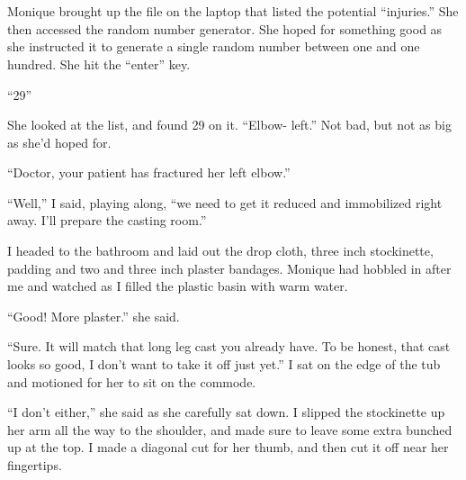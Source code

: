 \chapter{~}
\begin{thought}
Monique brought up the file on the laptop that listed the potential ``injuries.'' She then
accessed the random number generator. She hoped for something good as she instructed it to
generate a single random number between one and one hundred. She hit the ``enter'' key.
\end{thought}

``29''

\begin{thought}
She looked at the list, and found 29 on it. ``Elbow- left.'' Not bad, but not as big as she'd
hoped for.
\end{thought}

``Doctor, your patient has fractured her left elbow.''

``Well,'' I said, playing along, ``we need to get it reduced and immobilized right away. I'll
prepare the casting room.''

I headed to the bathroom and laid out the drop cloth, three inch stockinette, padding and
two and three inch plaster bandages. Monique had hobbled in after me and watched as I filled the
plastic basin with warm water.

``Good! More plaster.'' she said.

``Sure. It will match that long leg cast you already have. To be honest, that cast looks so
good, I don't want to take it off just yet.'' I sat on the edge of the tub and motioned for her
to sit on the commode.

``I don't either,'' she said as she carefully sat down. I slipped the stockinette up her arm
all the way to the shoulder, and made sure to leave some extra bunched up at the top. I made a
diagonal cut for her thumb, and then cut it off near her fingertips.

